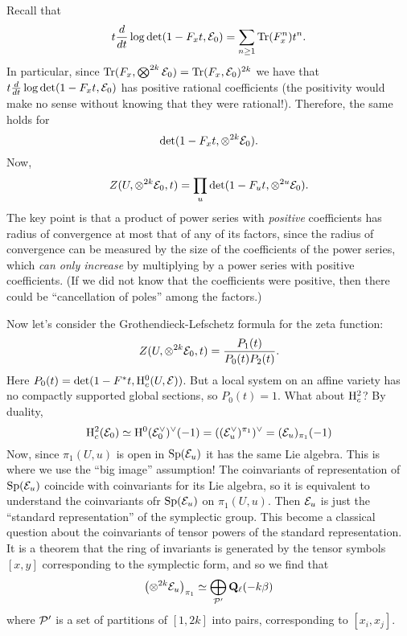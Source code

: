 Recall that 
\[
t \frac{d}{dt} \log \det (1-F_x t, \mathcal{E}_0) = \sum_{n \geq 1} \operatorname{Tr}(F_x^n) t^n.
\]
In particular, since $\operatorname{Tr}(F_x, \bigotimes^{2k} \mathcal{E}_0) = \operatorname{Tr}(F_x, \mathcal{E}_0)^{2k}$ we have that $t \frac{d}{dt} \log \det (1-F_x t, \mathcal{E}_0) $ has positive rational coefficients (the positivity would make no sense without knowing that they were rational!). Therefore, the same holds for 
\[
\det (1-F_x t, \otimes^{2k} \mathcal{E}_0) .
\]
Now, 
\[
Z(U, \otimes^{2k} \mathcal{E}_0, t) = \prod_u \det (1-F_u t, \otimes^{2u} \mathcal{E}_0).
\]
The key point is that a product of power series with \emph{positive} coefficients has radius of convergence at most that of any of its factors, since the radius of convergence can be measured by the size of the coefficients of the power series, which \emph{can only increase} by multiplying by a power series with positive coefficients. (If we did not know that the coefficients were positive, then there could be ``cancellation of poles'' among the factors.) 

Now let's consider the Grothendieck-Lefschetz formula for the zeta function:
\[
Z(U, \otimes^{2k} \mathcal{E}_0, t) = \frac{P_1(t)}{P_0(t) P_2(t)}.
\]
Here $P_0(t) = \det(1-F^* t , \mathrm{H}_c^0(U, \mathcal{E}))$. But a local system on an affine variety has no compactly supported global sections, so $P_0(t)=1$. What about $\mathrm{H}_c^2$? By duality, 
\[
\mathrm{H}_c^2 (\mathcal{E}_0) \simeq \mathrm{H}^0(\mathcal{E}_0^{\vee})^{\vee}(-1)  = ((\mathcal{E}_u^{\vee})^{\pi_1})^{\vee} = (\mathcal{E}_u)_{\pi_1}(-1)
\]
Now, since $\pi_1(U, u)$ is open in $\operatorname{Sp}(\mathcal{E}_u)$ it has the same Lie algebra. This is where we use the ``big image'' assumption! The coinvariants of representation of $\operatorname{Sp}(\mathcal{E}_u)$ coincide with coinvariants for its Lie algebra, so it is equivalent to understand the coinvariants ofr $\operatorname{Sp}(\mathcal{E}_u)$ on $\pi_1(U,u)$.  Then $\mathcal{E}_u$ is just the ``standard representation'' of the symplectic group. This become a classical question about the coinvariants of tensor powers of the standard representation. It is a theorem that the ring of invariants is generated by the tensor symbols $[x,y]$ corresponding to the symplectic form, and so we find that 
\[
\left( \otimes^{2k} \mathcal{E}_u \right)_{\pi_1} \simeq \bigoplus_{\mathcal{P}'} \mathbf{Q}_{\ell}(-k\beta)
\]
where $\mathcal{P}'$ is a set of partitions of $[1,2k]$ into pairs, corresponding to $[x_i,x_j]$. 

